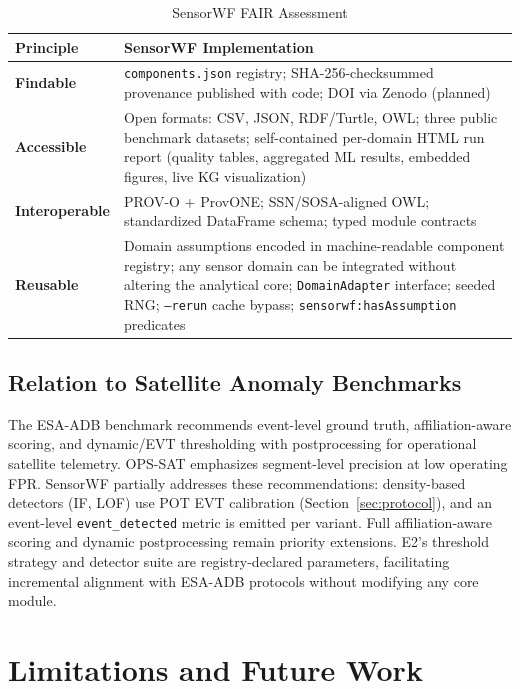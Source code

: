 \documentclass[conference]{IEEEtran}
\begin{document}
\begin{table}[t]
\caption{SensorWF FAIR Assessment}
\label{tab:fair}
\centering
\scriptsize
\setlength{\tabcolsep}{3pt}
\begin{tabular}{@{}lp{5.4cm}@{}}
\toprule
\textbf{Principle} & \textbf{SensorWF Implementation} \\
\midrule
\textbf{Findable}      & \texttt{components.json} registry; SHA-256-checksummed provenance published with code; DOI via Zenodo (planned) \\
\textbf{Accessible}    & Open formats: CSV, JSON, RDF/Turtle, OWL; three public benchmark datasets; self-contained per-domain HTML run report (quality tables, aggregated ML results, embedded figures, live KG visualization) \\
\textbf{Interoperable} & PROV-O + ProvONE; SSN/SOSA-aligned OWL; standardized DataFrame schema; typed module contracts \\
\textbf{Reusable}      & Domain assumptions encoded in machine-readable component registry; any sensor domain can be integrated without altering the analytical core; \texttt{DomainAdapter} interface; seeded RNG; \texttt{--rerun} cache bypass; \texttt{sensorwf:hasAssumption} predicates \\
\bottomrule
\end{tabular}
\end{table}

\subsection{Relation to Satellite Anomaly Benchmarks}

The ESA-ADB benchmark \cite{esa_adb2024} recommends event-level ground truth, affiliation-aware scoring, and dynamic/EVT thresholding with postprocessing for operational satellite telemetry. OPS-SAT \cite{ruszczak2025opssat} emphasizes segment-level precision at low operating FPR. SensorWF partially addresses these recommendations: density-based detectors (IF, LOF) use POT EVT calibration (Section~\ref{sec:protocol}), and an event-level \texttt{event\_detected} metric is emitted per variant. Full affiliation-aware scoring and dynamic postprocessing remain priority extensions. E2's threshold strategy and detector suite are registry-declared parameters, facilitating incremental alignment with ESA-ADB protocols without modifying any core module.

\section{Limitations and Future Work}
\label{sec:limitations}
\end{document}
